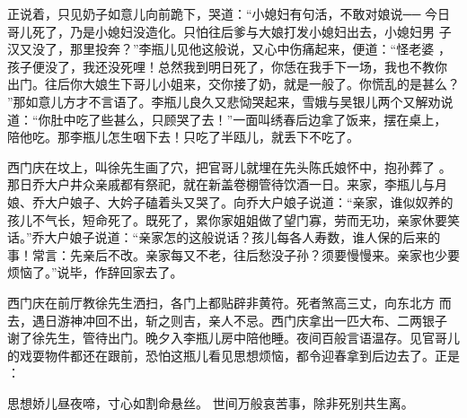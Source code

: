 正说着，只见奶子如意儿向前跪下，哭道：“小媳妇有句活，不敢对娘说──
今日哥儿死了，乃是小媳妇没造化。只怕往后爹与大娘打发小媳妇出去，小媳妇男
子汉又没了，那里投奔？”李瓶儿见他这般说，又心中伤痛起来，便道：“怪老婆
，孩子便没了，我还没死哩！总然我到明日死了，你恁在我手下一场，我也不教你
出门。往后你大娘生下哥儿小姐来，交你接了奶，就是一般了。你慌乱的是甚么？
”那如意儿方才不言语了。李瓶儿良久又悲恸哭起来，雪娥与吴银儿两个又解劝说
道：“你肚中吃了些甚么，只顾哭了去！”一面叫绣春后边拿了饭来，摆在桌上，
陪他吃。那李瓶儿怎生咽下去！只吃了半瓯儿，就丢下不吃了。

西门庆在坟上，叫徐先生画了穴，把官哥儿就埋在先头陈氏娘怀中，抱孙葬了
。那日乔大户井众亲戚都有祭祀，就在新盖卷棚管待饮酒一日。来家，李瓶儿与月
娘、乔大户娘子、大妗子磕着头又哭了。向乔大户娘子说道：“亲家，谁似奴养的
孩儿不气长，短命死了。既死了，累你家姐姐做了望门寡，劳而无功，亲家休要笑
话。”乔大户娘子说道：“亲家怎的这般说话？孩儿每各人寿数，谁人保的后来的
事！常言：先亲后不改。亲家每又不老，往后愁没子孙？须要慢慢来。亲家也少要
烦恼了。”说毕，作辞回家去了。

西门庆在前厅教徐先生洒扫，各门上都贴辟非黄符。死者煞高三丈，向东北方
而去，遇日游神冲回不出，斩之则吉，亲人不忌。西门庆拿出一匹大布、二两银子
谢了徐先生，管待出门。晚夕入李瓶儿房中陪他睡。夜间百般言语温存。见官哥儿
的戏耍物件都还在跟前，恐怕这瓶儿看见思想烦恼，都令迎春拿到后边去了。正是
：

思想娇儿昼夜啼，寸心如割命悬丝。
世间万般哀苦事，除非死别共生离。